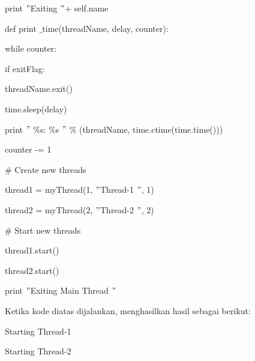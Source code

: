 \noindent 
{\fontsize{9pt}{9pt}\selectfont  \hspace*{0.5in} print  $ " $Exiting  $ " $+ self.name} \par
\noindent 
{\fontsize{9pt}{9pt}\selectfont def print $  \_  $time(threadName, delay, counter):} \par
\noindent 
{\fontsize{9pt}{9pt}\selectfont while counter:} \par
\noindent 
{\fontsize{9pt}{9pt}\selectfont  \hspace*{0.5in} if exitFlag:} \par
\noindent 
{\fontsize{9pt}{9pt}\selectfont  \hspace*{0.5in}  \hspace*{0.5in} threadName.exit()} \par
\noindent 
{\fontsize{9pt}{9pt}\selectfont  \hspace*{0.5in} time.sleep(delay)} \par
\noindent 
{\fontsize{9pt}{9pt}\selectfont  \hspace*{0.5in} print  $ " $ $  \%  $s:  $  \%  $s $ " $  $  \%  $ (threadName, time.ctime(time.time()))} \par
\noindent 
{\fontsize{9pt}{9pt}\selectfont counter -= 1} \par
\vspace{9pt}
\noindent 
{\fontsize{9pt}{9pt}\selectfont  $  \#  $ Create new threads} \par
\noindent 
{\fontsize{9pt}{9pt}\selectfont thread1 = myThread(1,  $ " $Thread-1 $ " $, 1)} \par
\noindent 
{\fontsize{9pt}{9pt}\selectfont thread2 = myThread(2,  $ " $Thread-2 $ " $, 2)} \par
\vspace{9pt}
\noindent 
{\fontsize{9pt}{9pt}\selectfont  $  \#  $ Start new threads} \par
\noindent 
{\fontsize{9pt}{9pt}\selectfont thread1.start()} \par
\noindent 
{\fontsize{9pt}{9pt}\selectfont thread2.start()} \par
\noindent 
{\fontsize{9pt}{9pt}\selectfont print  $ " $Exiting Main Thread $ " $} \par
\vspace{12pt}
	Ketika kode diatas dijalankan, menghasilkan hasil sebagai berikut:
\par
\noindent 
{\fontsize{10pt}{10pt}\selectfont Starting Thread-1} \par
\noindent 
{\fontsize{10pt}{10pt}\selectfont Starting Thread-2} \par
